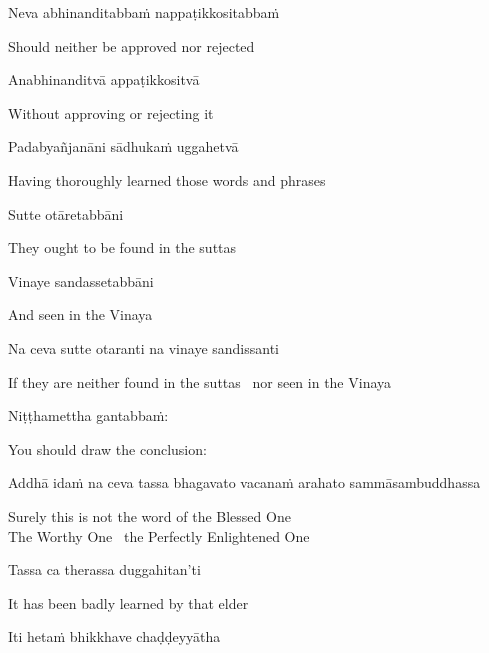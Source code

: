 Neva abhinanditabbaṁ nappaṭikkositabbaṁ

\begin{english}
  Should neither be approved nor rejected
\end{english}

Anabhinanditvā appaṭikkositvā

\begin{english}
  Without approving or rejecting it
\end{english}

Padabyañjanāni sādhukaṁ uggahetvā

\begin{english}
  Having thoroughly learned those words and phrases
\end{english}

Sutte otāretabbāni

\begin{english}
  They ought to be found in the suttas
\end{english}

Vinaye sandassetabbāni

\begin{english}
  And seen in the Vinaya
\end{english}

Na ceva sutte otaranti na vinaye sandissanti

\begin{english}
  If they are neither found in the suttas \breathmark\ nor seen in the Vinaya
\end{english}

Niṭṭhamettha gantabbaṁ:

\begin{english}
  You should draw the conclusion:
\end{english}

Addhā idaṁ na ceva tassa bhagavato vacanaṁ arahato sammāsambuddhassa

\begin{english}
  Surely this is not the word of the Blessed One\\
  The Worthy One \breathmark\ the Perfectly Enlightened One
\end{english}

Tassa ca therassa duggahitan’ti

\begin{english}
  It has been badly learned by that elder
\end{english}

Iti hetaṁ bhikkhave chaḍḍeyyātha

